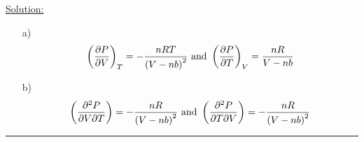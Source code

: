 \noindent
\underline{Solution:}\\

\begin{itemize}

\item[a)] $$\left(\frac{\partial P}{\partial V}\right)_T = -\frac{nRT}{\left(V - nb\right)^2}\textnormal{ and }\left(\frac{\partial P}{\partial T}\right)_V = \frac{nR}{V - nb}$$

\item[b)] $$\left(\frac{\partial^2P}{\partial V\partial T}\right) = -\frac{nR}{\left(V - nb\right)^2}\textnormal{ and }\left(\frac{\partial^2P}{\partial T\partial V}\right) = -\frac{nR}{\left(V - nb\right)^2}$$

\end{itemize}
\hrule\vspace{0.5cm}
